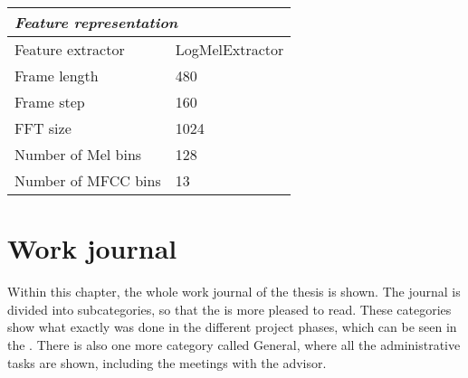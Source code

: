 \begin{table}[ht]
\begin{tabular}{l|l}
        \midrule[1pt]
        \multicolumn{2}{l}{\textit{Feature representation}} \\
        \midrule[1pt]
        Feature extractor & LogMelExtractor \\ 
        \hline
        Frame length & 480 \\
        \hline
        Frame step & 160 \\
        \hline
        FFT size & 1024 \\
        \hline
        Number of Mel bins & 128 \\
        \hline
        Number of MFCC bins & 13 \\
        \bottomrule
    \end{tabular}
\end{table}

\chapter{Work journal}
\label{app:Work-Journal}

Within this chapter, the whole work journal of the thesis is shown. The journal is divided into subcategories, so that the  is more pleased to read. These categories show what exactly was done in the different project phases, which can be seen in the . There is also one more category called \flqq General\frqq, where all the administrative tasks are shown, including the meetings with the advisor.

\clearpage
\landscapevalues

